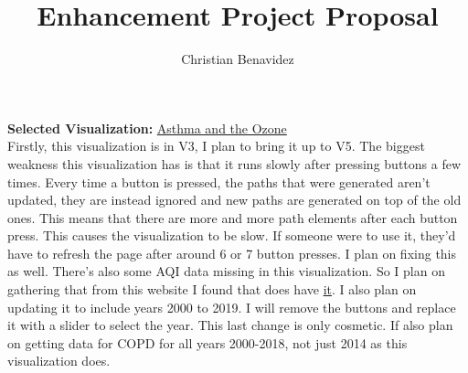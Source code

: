 \documentclass{article}[11pt]
\begin{document}
\title{Enhancement Project Proposal}
\author{Christian Benavidez}
\date{}
\maketitle

\textbf{Selected Visualization:} \href{https://sureshlodha.github.io/CMPS165_Winter15_FinalProjects/OzoneInTheAir/}{Asthma and the Ozone}\\

Firstly, this visualization is in V3, I plan to bring it up to V5. The biggest weakness this visualization has is that
it runs slowly after pressing buttons a few times. Every time a button is pressed, the paths that were generated
aren't updated, they are instead ignored and new paths are generated on top of the old ones. This means that
there are more and more path elements after each button press. This causes the visualization to be slow. If 
someone were to use it, they'd have to refresh the page after around 6 or 7 button presses. I plan on fixing this
as well. There's also some AQI data missing in this visualization. So I plan on gathering that from this website I 
found that does have \href{https://www.epa.gov/outdoor-air-quality-data/air-quality-index-report}{it}. I also plan on 
updating it to include years 2000 to 2019. I will remove the buttons and replace it with a slider to select the year.
This last change is only cosmetic. If also plan on getting data for COPD for all years 2000-2018, not just 2014 as
this visualization does.
\end{document}
